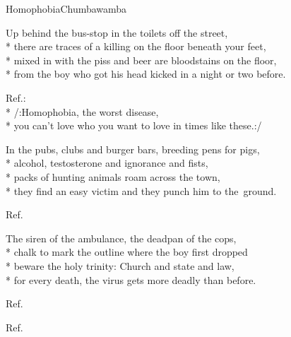 \documentclass[10.5pt]{book}
\begin{document}
\begin{poem}{Homophobia}{Chumbawamba}

\settowidth{\versewidth}{You can't love who you want to love in times like these}

Up behind the bus-stop in the toilets off the street,\\*
there are traces of a killing on the floor beneath your feet,\\*
mixed in with the piss and beer are bloodstains on the floor,\\*
from the boy who got his head kicked in a night or two before.

Ref.:\\*
/:Homophobia, the worst disease,\\*
you can't love who you want to love in times like these.:/

In the pubs, clubs and burger bars, breeding pens for pigs,\\*
alcohol, testosterone and ignorance and fists,\\*
packs of hunting animals roam across the town,\\*
they find an easy victim and they punch him to the~ground.

Ref.

The siren of the ambulance, the deadpan of the cops,\\*
chalk to mark the outline where the boy first dropped\\*
beware the holy trinity: Church and state and law,\\*
for every death, the virus gets more deadly than \mbox{before}.

Ref.

Ref.

\end{poem}
\end{document}
